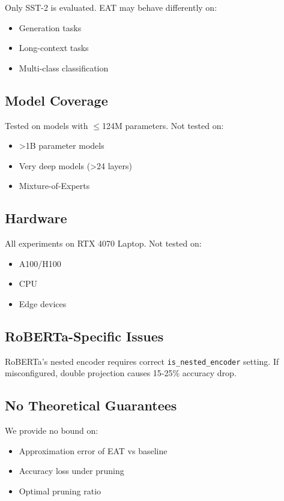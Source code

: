 Only SST-2 is evaluated. EAT may behave differently on:

\begin{itemize}
\item Generation tasks
\item Long-context tasks
\item Multi-class classification

\end{itemize}
\subsection{Model Coverage}

Tested on models with $\le$124M parameters. Not tested on:

\begin{itemize}
\item >1B parameter models
\item Very deep models (>24 layers)
\item Mixture-of-Experts

\end{itemize}
\subsection{Hardware}

All experiments on RTX 4070 Laptop. Not tested on:

\begin{itemize}
\item A100/H100
\item CPU
\item Edge devices

\end{itemize}
\subsection{RoBERTa-Specific Issues}

RoBERTa's nested encoder requires correct \texttt{is\_nested\_encoder} setting. If 
misconfigured, double projection causes 15-25\% accuracy drop.

\subsection{No Theoretical Guarantees}

We provide no bound on:

\begin{itemize}
\item Approximation error of EAT vs baseline
\item Accuracy loss under pruning
\item Optimal pruning ratio

\end{itemize}
